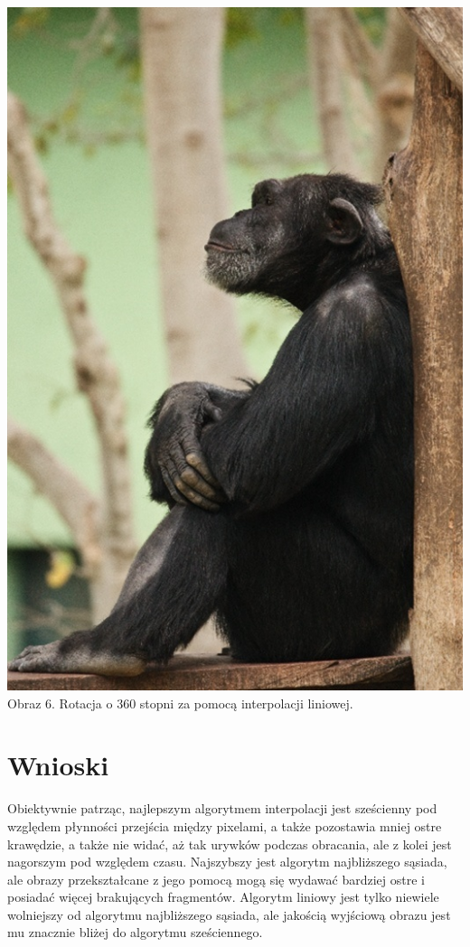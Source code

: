 \documentclass[14pt]{article}
\begin{document}
\begin{center}
\begin{minipage}{7cm}
\begin{center}
            \includegraphics[scale=0.2]{images/5x_BACK_TO_ORG_bc.jpg}
            \\ \small Obraz 6. Rotacja o 360 stopni za pomocą interpolacji liniowej.
      \end{center}
    \end{minipage}
\end{center}


\newpage
\section{Wnioski}
Obiektywnie patrząc, najlepszym algorytmem interpolacji jest sześcienny pod względem płynności 
przejścia między pixelami, a także pozostawia mniej ostre krawędzie, a także nie widać, aż tak urywków
podczas obracania, ale z kolei jest nagorszym pod względem czasu. Najszybszy jest algorytm najbliższego sąsiada,
ale obrazy przekształcane z jego pomocą mogą się wydawać bardziej ostre i posiadać więcej brakujących fragmentów.
Algorytm liniowy jest tylko niewiele wolniejszy od algorytmu najbliższego sąsiada, ale jakością wyjściową
obrazu jest mu znacznie bliżej do algorytmu sześciennego. 
\end{document}
